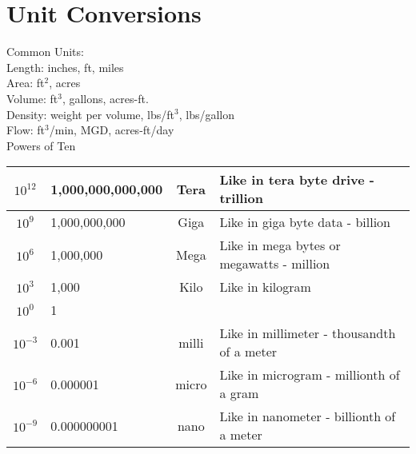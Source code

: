 \section{Unit Conversions}
Common Units:\\

Length:  inches, ft, miles\\

Area:  ft$^2$, acres \\

Volume:  ft$^3$, gallons, acres-ft.\\

Density:  weight per volume, lbs/ft$^3$, lbs/gallon\\

Flow:  ft$^3$/min, MGD, acres-ft/day\\

		


Powers of Ten

\begin{center}
    
   
    \begin{tabular}{ | c | p{4cm} | c |p{8cm}|}
    \hline


$10^{12}$ & 1,000,000,000,000 & Tera & Like in tera byte drive - trillion\\
\hline 
$10^{9}$ & 1,000,000,000 & Giga & Like in giga byte data - billion\\
\hline
$10^{6}$ & 1,000,000 & Mega & Like in mega bytes or megawatts - million\\
\hline 
$10^{3}$ & 1,000 & Kilo & Like in kilogram \\
\hline 
$10^{0}$ & 1 &  & \\
\hline 
$10^{-3}$ & 0.001 & milli & Like in millimeter - thousandth of a meter\\
\hline 
$10^{-6}$ & 0.000001 & micro & Like in microgram - millionth of a gram \\
\hline 
$10^{-9}$ & 0.000000001 & nano & Like in nanometer - billionth of a meter\\
\hline 


    \end{tabular}
    
    \end{center}


